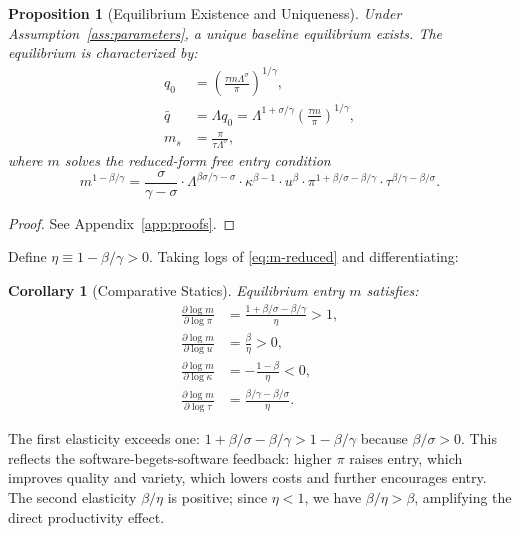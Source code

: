 \documentclass[11pt,a4paper]{article}
\newtheorem{proposition}{Proposition}
\newtheorem{corollary}{Corollary}
\theoremstyle{definition}
\theoremstyle{remark}
\begin{document}
\begin{proposition}[Equilibrium Existence and Uniqueness]\label{prop:existence}
Under Assumption~\ref{ass:parameters}, a unique baseline equilibrium exists. The equilibrium is characterized by:
\begin{align}
q_0 &= \left(\frac{\tau m \Lambda^\sigma}{\pi}\right)^{1/\gamma}, \label{eq:q0-eq}\\
\bar{q} &= \Lambda q_0 = \Lambda^{1+\sigma/\gamma}\left(\frac{\tau m}{\pi}\right)^{1/\gamma}, \label{eq:qbar-eq}\\
m_s &= \frac{\pi}{\tau \Lambda^\sigma}, \label{eq:ms-eq}
\end{align}
where $m$ solves the reduced-form free entry condition
\begin{equation}
m^{1 - \beta/\gamma} = \frac{\sigma}{\gamma - \sigma} \cdot \Lambda^{\beta\sigma/\gamma - \sigma} \cdot \kappa^{\beta-1} \cdot u^{\beta} \cdot \pi^{1 + \beta/\sigma - \beta/\gamma} \cdot \tau^{\beta/\gamma - \beta/\sigma}. \label{eq:m-reduced}
\end{equation}
\end{proposition}

\begin{proof}
See Appendix~\ref{app:proofs}.
\end{proof}

Define \(\eta \equiv 1 - \beta/\gamma > 0\). Taking logs of
\eqref{eq:m-reduced} and differentiating:

\begin{corollary}[Comparative Statics]\label{cor:comp-statics}
Equilibrium entry $m$ satisfies:
\begin{align}
\frac{\partial \log m}{\partial \log \pi} &= \frac{1 + \beta/\sigma - \beta/\gamma}{\eta} > 1, \label{eq:dm-dpi}\\
\frac{\partial \log m}{\partial \log u} &= \frac{\beta}{\eta} > 0, \label{eq:dm-du}\\
\frac{\partial \log m}{\partial \log \kappa} &= -\frac{1-\beta}{\eta} < 0, \label{eq:dm-dkappa}\\
\frac{\partial \log m}{\partial \log \tau} &= \frac{\beta/\gamma - \beta/\sigma}{\eta}. \label{eq:dm-dtau}
\end{align}
\end{corollary}

The first elasticity exceeds one:
\(1 + \beta/\sigma - \beta/\gamma > 1 - \beta/\gamma\) because
\(\beta/\sigma > 0\). This reflects the software-begets-software
feedback: higher \(\pi\) raises entry, which improves quality and
variety, which lowers costs and further encourages entry. The second
elasticity \(\beta/\eta\) is positive; since \(\eta < 1\), we have
\(\beta/\eta > \beta\), amplifying the direct productivity effect.
\end{document}
